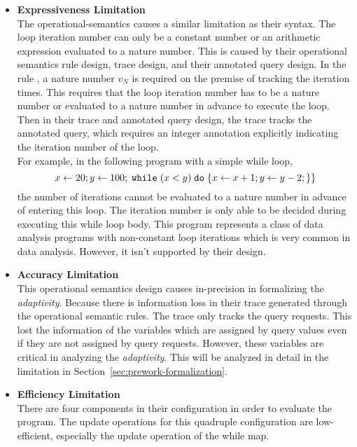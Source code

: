 \begin{itemize}
 \item \textbf{Expressiveness Limitation}
 \\
 The operational-semantics causes a similar limitation as their syntax.
 The loop iteration number can only be a constant number or an arithmetic expression evaluated to a nature number.
 This is caused by their operational semantics rule design, trace design, and their annotated query design.
 In the rule , a nature number $v_N$ is required on the premise of tracking the iteration times.
 This requires that the loop iteration number has to be a nature number or evaluated to a nature number in advance to execute the loop.
 Then in their trace and annotated query design,
 the trace tracks the annotated query, which requires an integer annotation explicitly indicating the iteration number of the loop.
 \\
 For example, in the following program with a simple while loop,
 \[
 {\mathrel{ x \leftarrow 20 }};
 \mathrel{ y \leftarrow 100 };
 \;\mathtt{while}\; (x < y) \;\mathtt{do}\; 
 \{
 \mathrel{ x \leftarrow x + 1 };
 \mathrel{ y \leftarrow y - 2 };
 \}\}
 \] 
 the number of iterations cannot be evaluated to a nature number in advance of entering this loop. 
 The iteration number is only
 able to be decided during executing this while loop body.
 This program represents a class of data analysis programs with non-constant loop iterations
 which is very common in data analysis. However, it isn't supported by their design.
 \item \textbf{Accuracy Limitation}
 \\
 This operational semantics design causes in-precision in formalizing the \emph{adaptivity}.
 Because there is information loss in their trace generated through the operational semantic rules.
 The trace only tracks the query requests. This lost the information of the variables
 which are assigned by query values even if they are not assigned by query requests. However, these variables
 are critical in analyzing the \emph{adaptivity}.
 This will be analyzed in detail in the limitation in Section~\ref{sec:prework-formalization}.
 \item \textbf{Efficiency Limitation}
 \\
 There are four components in their configuration in order to evaluate the program. 
 The update operations for this quadruple configuration are low-efficient, especially the update operation of the while map.
\end{itemize}